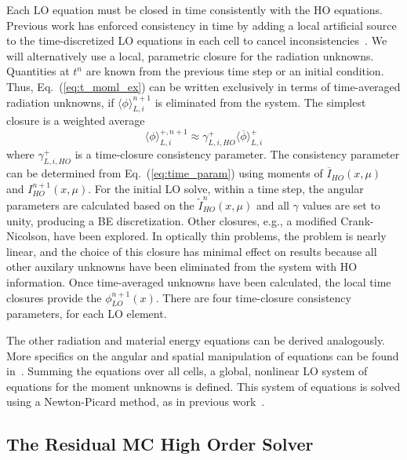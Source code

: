 \documentclass{anstrans}
\renewcommand{\eqref}[1]{(\ref{#1})}
\newcommand{\mom}[1]{\langle #1 \rangle}
\begin{document}
Each LO equation must be closed in time consistently with the HO
equations.   Previous work has enforced
consistency in time by adding a local artificial source to the time-discretized LO
equations in each cell to cancel inconsistencies~\cite{holo_rh}.  We will alternatively use a
local, parametric closure for the radiation unknowns. 
Quantities at $t^{n}$ are known from the previous time step or an initial condition.  
Thus, Eq.~\eqref{eq:t_moml_ex} can be written exclusively in terms
of time-averaged radiation unknowns, if $\mom{\phi}_{L,i}^{n+1}$ is eliminated from the
system.  The simplest closure is a weighted average
\begin{equation}\label{eq:time_param}
    \mom{\phi}_{L,i}^{+,n+1} \approx \gamma_{L,i,HO}^+ \mom{\overline{\phi}}_{L,i}^+
\end{equation}
where $\gamma_{L,i,HO}^+$ is a time-closure consistency parameter.  The consistency
parameter can be determined from Eq.~\eqref{eq:time_param} using moments of $\overline{I}_{HO}(x,\mu)$ and
$I^{n+1}_{HO}(x,\mu)$. For the initial LO solve, within a time step, the angular parameters
are calculated based on the $\tilde I_{HO}^n(x,\mu)$ and all $\gamma$ values are set to unity, producing a BE discretization.
Other closures, e.g., a modified Crank-Nicolson, have been explored.  In optically
thin problems, the problem is nearly linear, and the choice of this closure has minimal
effect on results because all other auxilary unknowns have been eliminated from the system
with HO information.
Once time-averaged unknowns have been calculated, the local time closures provide the $\phi_{LO}^{n+1}(x)$.  There are four time-closure consistency parameters, for each LO element. 

The other radiation and material energy equations can be derived analogously.  More specifics on the angular and spatial
manipulation of equations can be found in~\cite{bolding_nse}.  
Summing the equations over all cells, a global, nonlinear LO system of equations for the
moment unknowns is defined.  This system of equations is solved using a Newton-Picard method, as in
previous work~\cite{bolding_nse}. 


\subsection*{The Residual MC High Order Solver}
\label{sec:ho}
\end{document}
